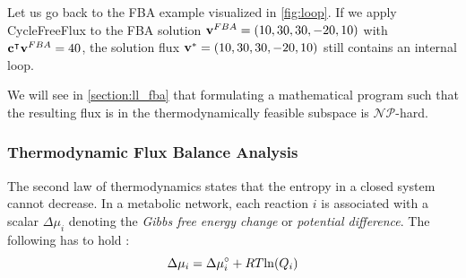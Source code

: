 Let us go back to the FBA example visualized in \cref{fig:loop}. If we apply CycleFreeFlux to the FBA solution $\bold v^{FBA} = (10,30,30,-20,10)$ with $\bold c^\intercal \bold v^{FBA} = 40$, the solution flux 
$\bold v^* = (10,30,30,-20,10)$ still contains an internal loop.

We will see in \cref{section:ll_fba} that formulating a mathematical program such that the resulting flux is in the thermodynamically feasible subspace is $\mathcal{NP}$-hard.






\subsubsection{Thermodynamic Flux Balance Analysis}
The second law of thermodynamics states that the entropy in a closed system cannot decrease. In a metabolic network, each reaction $i$ is associated with a scalar $\Delta \mu_i$ denoting the \textit{Gibbs free energy change} %
or \textit{potential difference}.
The following has to hold \cite{elimination_infeasible_loops}: 
\begin{equation*}
    \Delta \mu_i = \Delta \mu \degree_i + RT \mathrm{ln} (Q_i)
\end{equation*}

